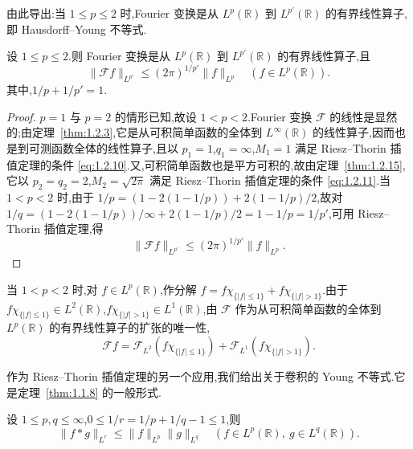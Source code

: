 由此导出:当 $1 \leq p \leq 2$ 时,Fourier 变换是从 $L^{p}(\mathbb{R})$ 到 $L^{p'}(\mathbb{R})$ 的有界线性算子,即 Hausdorff--Young 不等式.

\begin{theorem}\label{thm:1.2.18}
设 $1 \leq p \leq 2$.则 Fourier 变换是从 $L^{p}(\mathbb{R})$ 到 $L^{p'}(\mathbb{R})$ 的有界线性算子,且
\begin{equation*}
\| \mathcal{F}f \|_{L^{p'}} \leq (2\pi)^{1/p'}\| f \|_{L^{p}} \quad (f \in L^{p}(\mathbb{R})).
\end{equation*}
其中,$1/p + 1/p' = 1$.
\end{theorem}

\begin{proof}
$p = 1$ 与 $p = 2$ 的情形已知,故设 $1 < p < 2$.Fourier 变换 $\mathcal{F}$ 的线性是显然的;由定理~\ref{thm:1.2.3},它是从可积简单函数的全体到 $L^{\infty}(\mathbb{R})$ 的线性算子,因而也是到可测函数全体的线性算子,且以 $p_{1} = 1$,$q_{1} = \infty$,$M_{1} = 1$ 满足 Riesz--Thorin 插值定理的条件 \eqref{eq:1.2.10}.又,可积简单函数也是平方可积的,故由定理~\ref{thm:1.2.15},它以 $p_{2} = q_{2} = 2$,$M_{2} = \sqrt{2\pi}$ 满足 Riesz--Thorin 插值定理的条件 \eqref{eq:1.2.11}.当 $1 < p < 2$ 时,由于 $1/p = (1 - 2(1 - 1/p)) + 2(1 - 1/p)/2$,故对 $1/q = (1 - 2(1 - 1/p))/\infty + 2(1 - 1/p)/2 = 1 - 1/p = 1/p'$,可用 Riesz--Thorin 插值定理,得
\begin{equation*}
\| \mathcal{F}f \|_{L^{p'}} \leq (2\pi)^{1/p'}\| f \|_{L^{p}}.
\end{equation*}
\end{proof}

\begin{note}\label{note:1.2.19}
当 $1 < p < 2$ 时,对 $f \in L^{p}(\mathbb{R})$,作分解 $f = f\chi_{\{|f| \leq 1\}} + f\chi_{\{|f| > 1\}}$.由于 $f\chi_{\{|f| \leq 1\}} \in L^{2}(\mathbb{R})$,$f\chi_{\{|f| > 1\}} \in L^{1}(\mathbb{R})$,由 $\mathcal{F}$ 作为从可积简单函数的全体到 $L^{p}(\mathbb{R})$ 的有界线性算子的扩张的唯一性,
\begin{equation*}
\mathcal{F}f = \mathcal{F}_{L^{2}}(f\chi_{\{|f| \leq 1\}}) + \mathcal{F}_{L^{1}}(f\chi_{\{|f| > 1\}}).
\end{equation*}
\end{note}

作为 Riesz--Thorin 插值定理的另一个应用,我们给出关于卷积的 Young 不等式.它是定理~\ref{thm:1.1.8} 的一般形式.

\begin{theorem}\label{thm:1.2.20}
设 $1 \leq p, q \leq \infty$,$0 \leq 1/r = 1/p + 1/q - 1 \leq 1$,则
\begin{equation*}
\| f * g \|_{L^{r}} \leq \| f \|_{L^{p}}\| g \|_{L^{q}} \quad (f \in L^{p}(\mathbb{R}),\ g \in L^{q}(\mathbb{R})).
\end{equation*}
\end{theorem}

